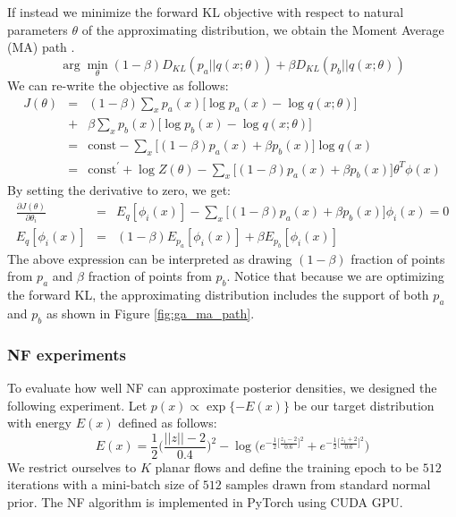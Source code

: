 If instead we minimize the forward KL objective with respect to natural parameters $\theta$ of the approximating distribution, we obtain the Moment Average (MA) path \cite{Grosse2013}. 
\begin{equation}
    \arg \min_\theta (1-\beta)D_{KL}(p_a||q(x;\theta)) + \beta D_{KL}(p_b||q(x;\theta))
\end{equation}
We can re-write the objective as follows:
\begin{eqnarray}
    J(\theta) &=& (1-\beta)\sum_x p_a(x)\big[\log p_a(x) - \log q(x;\theta) \big] \nonumber \\
    &+& \beta \sum_x p_b(x)\big[\log p_b(x) - \log q(x;\theta)\big] \\
    &=& \mathrm{const} - \sum_{x}\big[(1-\beta)p_a(x) + \beta p_b(x)]\log q(x) \\
    &=& \mathrm{const}^{\prime} + \log Z(\theta) - \sum_x\big[(1-\beta)p_a(x)+\beta p_b(x)\big]\theta^{T}\phi(x)
\end{eqnarray}
By setting the derivative to zero, we get:
\begin{eqnarray}
    \frac{\partial J(\theta)}{\partial \theta_i} &=& E_q[\phi_i(x)] - \sum_x\big[(1-\beta)p_a(x)+\beta p_b(x)\big]\phi_i(x) = 0 \\
    E_q[\phi_i(x)] &=& (1-\beta)E_{p_a}[\phi_i(x)] + \beta E_{p_b}[\phi_i(x)]
\end{eqnarray}
The above expression can be interpreted as drawing $(1-\beta)$ fraction of points from $p_a$ and $\beta$ fraction of points from $p_b$. Notice that because we are optimizing the forward KL, the approximating distribution includes the support of both $p_a$ and $p_b$ as shown in Figure \ref{fig:ga_ma_path}. 

\subsubsection{NF experiments}

To evaluate how well NF can approximate posterior densities, we designed the following experiment. Let $p(x) \propto \exp\{-E(x)\}$ be our target distribution with energy $E(x)$ defined as follows:
\begin{equation}
    E(x) = \frac{1}{2}\bigg(\frac{||z||-2}{0.4}\bigg)^{2} - \log \bigg(e^{-\frac{1}{2}\big[\frac{z_1-2}{0.6}\big]^{2}} + e^{-\frac{1}{2}\big[\frac{z_1+2}{0.6}\big]^{2}} \bigg)
\end{equation}
We restrict ourselves to $K$ planar flows and define the training epoch to be $512$ iterations with a mini-batch size of $512$ samples drawn from standard normal prior. The NF algorithm is implemented in PyTorch using CUDA GPU. 

